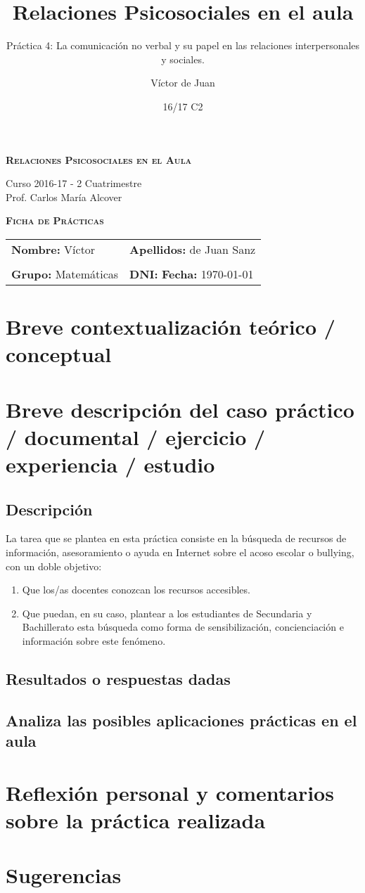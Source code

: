 \documentclass[palatino,nochap]{apuntesURJC}
\title{Relaciones Psicosociales en el aula}
\subtitle{Práctica 4: La comunicación no verbal y su papel en las relaciones interpersonales y sociales.}
\author{Víctor de Juan}
\date{16/17 C2}
\newcommand{\makeheader}[1]{
\begin{center}
\Large \textbf{\textsc{Relaciones Psicosociales en el Aula}}\\
\end{center}
\begin{center}
\large Curso 2016-17 - 2 Cuatrimestre\\
Prof. Carlos María Alcover
\end{center}

\begin{center}
\Large \textbf{\textsc{Ficha de Prácticas}}
\end{center}

\begin{center}
\begin{tabular}{ll}
\hspace{2cm}\textbf{Nombre:} Víctor &  \hspace{1.5cm} \textbf{Apellidos:} de Juan Sanz\\
\vspace{0.3cm}&\\
\textbf{Grupo:} Matemáticas 	& \textbf{DNI:} %
 \hspace{3cm} \textbf{Fecha:} #1
\end{tabular}
\end{center}
}
\begin{document}
\pagestyle{plain}
\maketitle

\makeheader{\today}

\section{Breve contextualización teórico / conceptual}
\label{intro}

\section{Breve descripción del caso práctico / documental / ejercicio / experiencia / estudio}

\subsection{Descripción}

La tarea que se plantea en esta práctica consiste en la búsqueda de recursos
de información, asesoramiento o ayuda en Internet sobre el acoso escolar o
bullying, con un doble objetivo:
\begin{enumerate}
\item Que los/as docentes conozcan los recursos accesibles.
\item Que puedan, en su caso, plantear a los estudiantes de Secundaria y Bachillerato esta búsqueda como forma de sensibilización, concienciación e información sobre este fenómeno.
\end{enumerate}

\subsection{Resultados o respuestas dadas}


\subsection{Analiza las posibles aplicaciones prácticas en el aula}


\section{Reflexión personal y comentarios sobre la práctica realizada}


\section{Sugerencias}



%
%

\printindex
\end{document}
